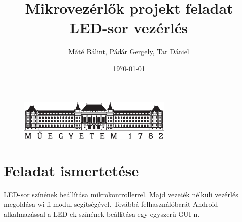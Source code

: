 \documentclass[12pt]{extarticle}
\title{\huge Mikrovezérlők projekt feladat\\[10pt]
	\Large LED-sor vezérlés}
\date{\today}
\author{Máté Bálint, Pádár Gergely, Tar Dániel }
\begin{document}
	
	\begin{titlepage}
		
		\maketitle
		\thispagestyle{fancy}
		
		\begin{figure}
			\begin{center}
				\includegraphics[height=2cm]{logo_bme_kicsi.eps}
			\end{center}
		\end{figure}
		
	\end{titlepage}
	
	
	\newpage
	\tableofcontents
	
	
	\newpage
	
	
	\section{Feladat ismertetése}
	
	LED-sor színének beállítása mikrokontrollerrel. Majd vezeték nélküli vezérlés megoldása wi-fi modul segítségével. Továbbá felhasználóbarát Android alkalmazással a LED-ek színének beállítása egy egyszerű GUI-n.
	
\end{document}
